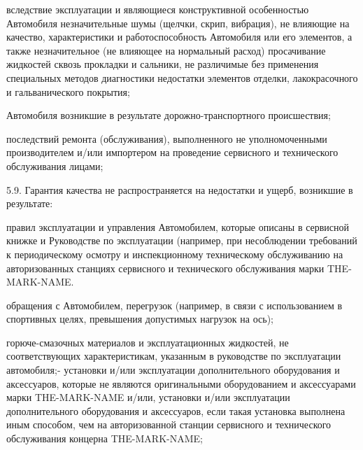 \documentclass[a4paper,12pt]{article}
\begin{document}
 \begin{itemize} вследствие эксплуатации и являющиеся конструктивной особенностью Автомобиля незначительные шумы (щелчки, скрип, вибрация), не влияющие на качество, характеристики и работоспособность Автомобиля или его элементов, а также незначительное (не влияющее на нормальный расход) просачивание жидкостей сквозь прокладки и сальники, не различимые без применения специальных методов диагностики недостатки элементов отделки, лакокрасочного и гальванического покрытия;\end{itemize}
 \begin{itemize} Автомобиля возникшие в результате дорожно-транспортного происшествия;\end{itemize}
 \begin{itemize} последствий ремонта (обслуживания), выполненного не уполномоченными производителем и/или импортером на проведение сервисного и технического обслуживания лицами;\end{itemize}
\begin{description}\item5.9. Гарантия качества не распространяется на недостатки и ущерб, возникшие в результате:\end{description}
 \begin{itemize} правил эксплуатации и управления Автомобилем, которые описаны в сервисной книжке и Руководстве по эксплуатации (например, при несоблюдении требований к периодическому осмотру и инспекционному техническому обслуживанию на авторизованных станциях сервисного и технического обслуживания марки  THE-MARK-NAME.\end{itemize}
 \begin{itemize} обращения с Автомобилем, перегрузок (например, в связи с использованием в спортивных целях, превышения допустимых нагрузок на ось);\end{itemize}
 \begin{itemize} горюче-смазочных материалов и эксплуатационных жидкостей, не соответствующих характеристикам, указанным в руководстве по эксплуатации автомобиля;- установки и/или эксплуатации дополнительного оборудования и аксессуаров, которые не являются оригинальными оборудованием и аксессуарами марки  THE-MARK-NAME и/или,
 установки и/или эксплуатации дополнительного оборудования и аксессуаров, если такая установка выполнена иным способом, чем на авторизованной станции сервисного и технического обслуживания концерна  THE-MARK-NAME;\end{itemize}
\end{document}
